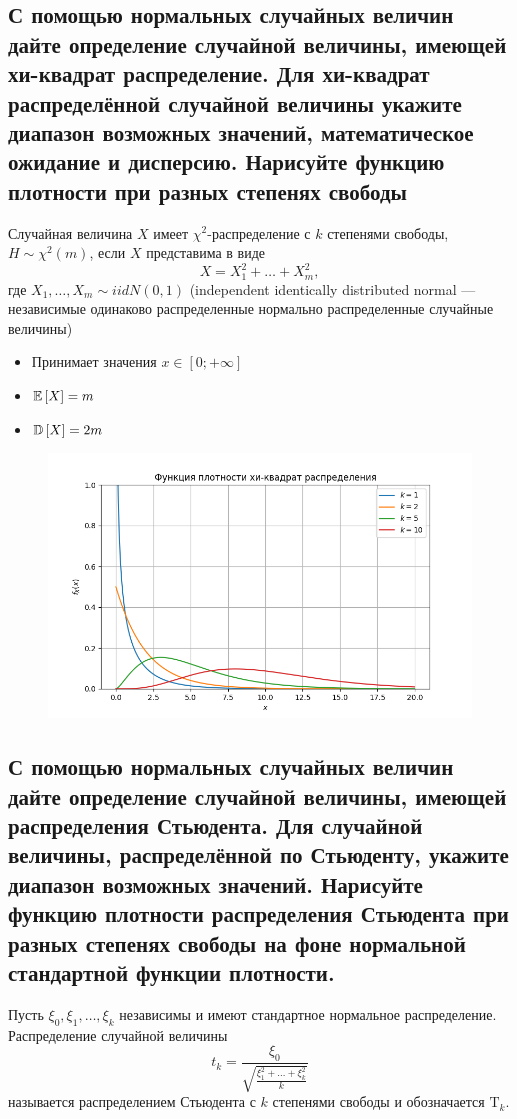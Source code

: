 \documentclass{article}
\begin{document}
\newpage
\subsection{С помощью нормальных случайных величин дайте определение случайной величины, имеющей хи-квадрат распределение. Для хи-квадрат распределённой случайной величины укажите диапазон возможных значений, математическое ожидание и дисперсию. Нарисуйте функцию плотности при разных степенях свободы}
 Случайная величина $X$ имеет $\chi^2$-распределение с $k$ степенями свободы, $H\sim\chi^2(m)$, если $X$ представима в виде
\begin{equation*}
    X=X_1^2+\ldots+X_m^2,
\end{equation*}
где $X_1,\ldots,X_m\sim iidN(0,1)$ (independent identically distributed normal — независимые одинаково распределенные нормально распределенные случайные величины)
\begin{itemize}
    \item Принимает значения $x\in[0;+\infty]$
    \item $\mathbb{E}\left[X\right]=m$
    \item $\mathbb{D}\left[X\right]=2m$
\end{itemize}
\begin{figure}[h]
    \centering
    \includegraphics[width=0.8\linewidth]{chi.png}
\end{figure}

\newpage
\subsection{С помощью нормальных случайных величин дайте определение случайной величины, имеющей распределения Стьюдента. Для случайной величины, распределённой по Стьюденту, укажите диапазон возможных значений. Нарисуйте функцию плотности распределения Стьюдента при разных степенях свободы на фоне нормальной стандартной функции плотности.}
 Пусть $\xi_0, \xi_1, \ldots, \xi_k$ независимы и имеют стандартное нормальное распределение. Распределение случайной величины
$$
t_k=\frac{\xi_0}{\sqrt{\frac{\xi_1^2+\ldots+\xi_k^2}{k}}}
$$
называется распределением Стьюдента с $k$ степенями свободы и обозначается $\mathrm{T}_k$.
\end{document}
